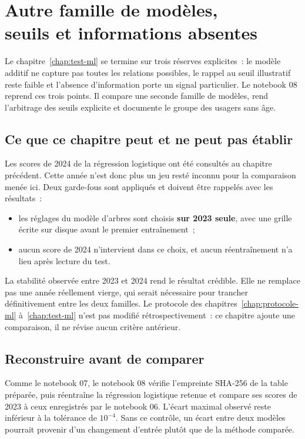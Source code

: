 \chapter[Autre famille de modèles, seuils et informations absentes]{Autre famille de modèles,\\seuils et informations absentes}
\label{chap:comparaison}

Le chapitre~\ref{chap:test-ml} se termine sur trois réserves explicites~: le modèle additif
ne capture pas toutes les relations possibles, le rappel au seuil illustratif reste faible
et l'absence d'information porte un signal particulier. Le notebook 08 reprend ces trois
points. Il compare une seconde famille de modèles, rend l'arbitrage des seuils explicite
et documente le groupe des usagers sans âge.

\section{Ce que ce chapitre peut et ne peut pas établir}
Les scores de 2024 de la régression logistique ont été consultés au chapitre précédent.
Cette année n'est donc plus un jeu resté inconnu pour la comparaison menée ici. Deux
garde-fous sont appliqués et doivent être rappelés avec les résultats~:

\begin{itemize}\setlength{\itemsep}{1pt}
\item les réglages du modèle d'arbres sont choisis \textbf{sur 2023 seule}, avec une
grille écrite sur disque avant le premier entraînement~;
\item aucun score de 2024 n'intervient dans ce choix, et aucun réentraînement n'a lieu
après lecture du test.
\end{itemize}

La stabilité observée entre 2023 et 2024 rend le résultat crédible. Elle ne remplace pas
une année réellement vierge, qui serait nécessaire pour trancher définitivement entre les
deux familles. Le protocole des chapitres~\ref{chap:protocole-ml} à~\ref{chap:test-ml}
n'est pas modifié rétrospectivement~: ce chapitre ajoute une comparaison, il ne révise
aucun critère antérieur.

\section{Reconstruire avant de comparer}
Comme le notebook 07, le notebook 08 vérifie l'empreinte SHA-256 de la table préparée,
puis réentraîne la régression logistique retenue et compare ses scores de 2023 à ceux
enregistrés par le notebook 06. L'écart maximal observé reste inférieur à la tolérance
de $10^{-4}$. Sans ce contrôle, un écart entre deux modèles pourrait provenir d'un
changement d'entrée plutôt que de la méthode comparée.

